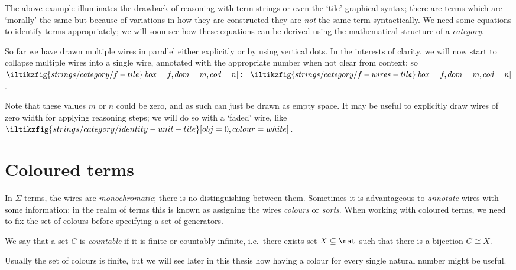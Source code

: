The above example illuminates the drawback of reasoning with term strings or
even the `tile' graphical syntax; there are terms which are `morally' the same
but because of variations in how they are constructed they are \emph{not} the
same term syntactically.
We need some equations to identify terms appropriately; we will soon see how
these equations can be derived using the mathematical structure of a
\emph{category}.

\begin{notation}\label{not:arbitrary-width-wires}
    So far we have drawn multiple wires in parallel either explicitly or
    by using vertical dots.
    In the interests of clarity, we will now start to collapse multiple wires
    into a single wire, annotated with the appropriate number when not clear
    from context: so \(
    \iltikzfig{strings/category/f-tile}[box=f,dom=m,cod=n]
    \coloneqq
    \iltikzfig{strings/category/f-wires-tile}[box=f,dom=m,cod=n]
    \).

    Note that these values \(m\) or \(n\) could be zero, and as such can just be
    drawn as empty space.
    It may be useful to explicitly draw wires of zero width for applying
    reasoning steps; we will do so with a `faded' wire, like \(
    \iltikzfig{strings/category/identity-unit-tile}[obj=0,colour=white]
    \).
\end{notation}

\section{Coloured terms}

In \(\Sigma\)-terms, the wires are \emph{monochromatic}; there is no
distinguishing between them.
Sometimes it is advantageous to \emph{annotate} wires with some information: in
the realm of terms this is known as assigning the wires \emph{colours} or
\emph{sorts}.
When working with coloured terms, we need to fix the set of colours before
specifying a set of generators.

\begin{notation}
    We say that a set \(C\) is \emph{countable} if it is finite or countably
    infinite, i.e.\ there exists set \(X \subseteq \nat\) such that there is a
    bijection \(C \cong X\).
\end{notation}

\begin{remark}
    Usually the set of colours is finite, but we will see later in this thesis
    how having a colour for every single natural number might be useful.
\end{remark}

